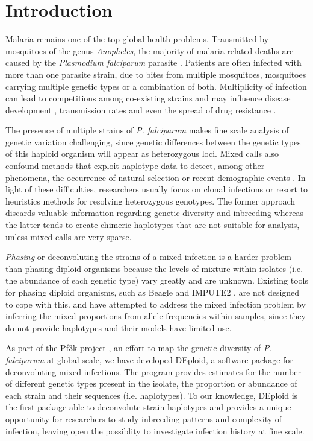\documentclass{bioinfo}
\begin{document}
\maketitle

\section{Introduction}
Malaria remains one of the top global health problems. Transmitted by mosquitoes of the genus {\it Anopheles}, the majority of malaria related deaths are caused by the {\it Plasmodium falciparum} parasite \citep{WHO2016}. Patients are often infected with  more than one parasite strain, due to bites from multiple mosquitoes, mosquitoes carrying multiple genetic types or a combination of both. Multiplicity of infection  can lead to competitions among co-existing strains and may influence disease development \citep{deRoode2005}, transmission rates \citep{Arnot1998} and even the spread of drug resistance \citep{deRoode2004}.

The presence of multiple strains of {\it P. falciparum} makes fine scale analysis of genetic variation challenging, since genetic differences between the genetic types of this haploid organism will appear as heterozygous loci. Mixed calls also confound methods that exploit haplotype data to detect, among other phenomena, the occurrence of natural selection or recent demographic events \citep{Harris2013, Lawson2012, Mathieson2014, Sabeti2002}. In light of these difficulties, researchers usually focus on clonal infections or resort to heuristics methods for resolving heterozygous genotypes. The former approach discards valuable information regarding genetic diversity and inbreeding whereas the latter tends to create chimeric haplotypes that are not suitable for analysis, unless mixed calls are very sparse.

{\it Phasing} or deconvoluting the strains of a mixed infection is a harder problem than phasing diploid organisms because the levels of mixture within isolates (i.e. the abundance of each genetic type) vary greatly and are unknown.  Existing tools for phasing diploid organisms, such as Beagle \citep{Browning2007} and IMPUTE2 \citep{Howie2009}, are not designed to cope with this. \citet{Galinsky2015} and \citet{Jack2016} have attempted to address the mixed infection problem by inferring the mixed proportions from allele frequencies within samples, since they do not provide haplotypes and their models have limited use.

As part of the Pf3k project \citep{Pf3k2016}, an effort to map the genetic diversity of {\it P. falciparum} at global scale, we have developed {\textmd DEploid}, a software package for deconvoluting mixed infections. The program provides estimates for the number of different genetic types present in the isolate, the proportion or abundance of each strain and their sequences (i.e. haplotypes). To our knowledge, DEploid is the first package able to deconvolute strain haplotypes and provides a unique opportunity for researchers to study inbreeding patterns and complexity of infection, leaving open the possiblity to investigate infection history at fine scale.
\end{document}
